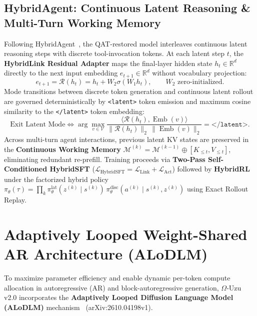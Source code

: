 \documentclass[10pt,a4paper]{article}
\begin{document}
\subsection{HybridAgent: Continuous Latent Reasoning \& Multi-Turn Working Memory}
Following HybridAgent~\cite{hybridagent2026}, the QAT-restored model interleaves continuous latent reasoning steps with discrete tool-invocation tokens. At each latent step $t$, the \textbf{HybridLink Residual Adapter} maps the final-layer hidden state $h_t \in \mathbb{R}^d$ directly to the next input embedding $e_{t+1} \in \mathbb{R}^d$ without vocabulary projection:
\begin{equation}
  e_{t+1} = \mathcal{R}(h_t) = h_t + W_2 \sigma(W_1 h_t), \qquad W_2 \text{ zero-initialized}.
\end{equation}
Mode transitions between discrete token generation and continuous latent rollout are governed deterministically by \texttt{<latent>} token emission and maximum cosine similarity to the \texttt{</latent>} token embedding:
\begin{equation}
  \text{Exit Latent Mode} \iff \arg\max_{v \in \mathcal{V}} \frac{\langle \mathcal{R}(h_t), \operatorname{Emb}(v) \rangle}{\|\mathcal{R}(h_t)\|_2 \, \|\operatorname{Emb}(v)\|_2} = \texttt{</latent>}.
\end{equation}
Across multi-turn agent interactions, previous latent KV states are preserved in the \textbf{Continuous Working Memory} $\mathcal{M}^{(k)} = \mathcal{M}^{(k-1)} \oplus [K_{\le t}, V_{\le t}]$, eliminating redundant re-prefill. Training proceeds via \textbf{Two-Pass Self-Conditioned HybridSFT} ($\mathcal{L}_{\mathrm{HybridSFT}} = \mathcal{L}_{\mathrm{Link}} + \mathcal{L}_{\mathrm{Act}}$) followed by \textbf{HybridRL} under the factorized hybrid policy $\pi_\theta(\tau) = \prod_{k} \pi_\theta^{\mathrm{lat}}(z^{(k)} \mid s^{(k)}) \, \pi_\theta^{\mathrm{disc}}(a^{(k)} \mid s^{(k)}, z^{(k)})$ using Exact Rollout Replay.

\section{Adaptively Looped Weight-Shared AR Architecture (ALoDLM)}

To maximize parameter efficiency and enable dynamic per-token compute allocation in autoregressive (AR) and block-autoregressive generation, $\Omega$-Uzu v2.0 incorporates the \textbf{Adaptively Looped Diffusion Language Model (ALoDLM)} mechanism~\cite{alodlm2026} (arXiv:2610.04198v1).
\end{document}
